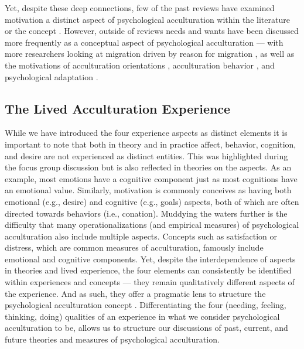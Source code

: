 \documentclass[man, 12pt, a4paper]{apa7}
\begin{document}
Yet, despite these deep connections, few of the past reviews have examined motivation a distinct aspect of psychological acculturation within the literature or the concept \citep[including,][]{Ward2001a, Ward2019}. However, outside of reviews needs and wants have been discussed more frequently as a conceptual aspect of psychological acculturation --- with more researchers looking at migration driven by reason for migration \citep{Sandu2018}, as well as the motivations of acculturation orientations \citep{Recker2017a}, acculturation behavior \citep{Reece2000}, and psychological adaptation \citep{Safdar2003}. 

\subsection{The Lived Acculturation Experience}
While we have introduced the four experience aspects as distinct elements it is important to note that both in theory and in practice affect, behavior, cognition, and desire are not experienced as distinct entities. This was highlighted during the focus group discussion but is also reflected in theories on the aspects. As an example, most emotions have a cognitive component just as most cognitions have an emotional value. Similarly, motivation is commonly conceives as having both emotional (e.g., desire) and cognitive (e.g., goals) aspects, both of which are often directed towards behaviors (i.e., conation). Muddying the waters further is the difficulty that many operationalizations (and empirical measures) of psychological acculturation also include multiple aspects. Concepts such as satisfaction or distress, which are common measures of acculturation, famously include emotional and cognitive components.  Yet, despite the interdependence of aspects in theories and lived experience, the four elements can consistently be identified within experiences and concepts --- they remain qualitatively different aspects of the experience. And as such, they offer a pragmatic lens to structure the psychological acculturation concept \citep{Kuhn1962}. Differentiating the four (needing, feeling, thinking, doing) qualities of an experience in what we consider psychological acculturation to be, allows us to structure our discussions of past, current, and future theories and measures of psychological acculturation.
\end{document}
